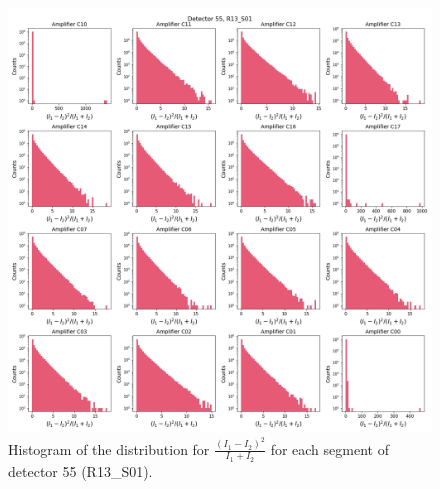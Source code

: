 \begin{figure}[!htb]
    \centering
    \includegraphics[width=\textwidth]{Figures/Histogram_ratioIM_det55.png}
    \caption{Histogram of the distribution for $\frac{(I_1 - I_2)^2}{I_1 + I_2}$ for each segment of detector 55 (R13\_S01). }
    \label{fig:hist_ratioIM}
\end{figure}


